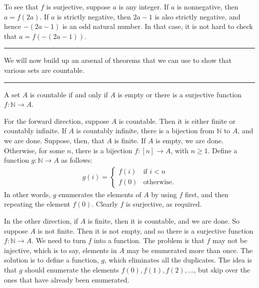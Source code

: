 \documentclass[letterpaper,10pt,english]{sphinxmanual}
\begin{document}
\sphinxAtStartPar
To see that \(f\) is surjective, suppose \(a\) is any integer. If \(a\) is nonnegative, then \(a = f(2 a)\). If \(a\) is strictly negative, then \(2 a - 1\) is also strictly negative, and hence \(-(2 a - 1)\) is an odd natural number. In that case, it is not hard to check that \(a = f(-(2a - 1))\).


\bigskip\hrule\bigskip


\sphinxAtStartPar
We will now build up an arsenal of theorems that we can use to show that various sets are countable.


\bigskip\hrule\bigskip


\sphinxAtStartPar
{} A set \(A\) is countable if and only if \(A\) is empty or there is a surjective function \(f : \mathbb{N} \to A\).

\sphinxAtStartPar
{} For the forward direction, suppose \(A\) is countable. Then it is either finite or countably infinite. If \(A\) is countably infinite, there is a bijection from \(\mathbb{N}\) to \(A\), and we are done. Suppose, then, that \(A\) is finite. If \(A\) is empty, we are done. Otherwise, for some \(n\), there is a bijection \(f : [n] \to A\), with \(n \geq 1\). Define a function \(g : \mathbb{N} \to A\) as follows:
\begin{equation*}
\begin{split}g(i) = \begin{cases}
         f(i) & \mbox{if $i < n$} \\
         f(0) & \mbox{otherwise.}
       \end{cases}\end{split}
\end{equation*}
\sphinxAtStartPar
In other words, \(g\) enumerates the elements of \(A\) by using \(f\) first, and then repeating the element \(f(0)\). Clearly \(f\) is surjective, as required.

\sphinxAtStartPar
In the other direction, if \(A\) is finite, then it is countable, and we are done. So suppose \(A\) is not finite. Then it is not empty, and so there is a surjective function \(f : \mathbb{N} \to A\). We need to turn \(f\) into a  function. The problem is that \(f\) may not be injective, which is to say, elements in \(A\) may be enumerated more than once. The solution is to define a function, \(g\), which eliminates all the duplicates. The idea is that \(g\) should enumerate the elements \(f(0), f(1), f(2), \ldots\), but skip over the ones that have already been enumerated.
\end{document}

